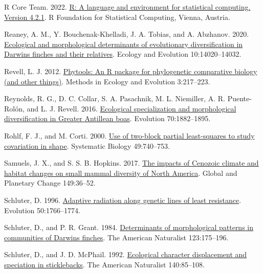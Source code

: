 \documentclass[
  11pt,
]{article}
\newlength{\cslhangindent}
\newlength{\cslentryspacingunit} %
\newenvironment{CSLReferences}[2] %
 {%
  \setlength{\parindent}{0pt}
  \ifodd #1
  \let\oldpar\par
  \def\par{\hangindent=\cslhangindent\oldpar}
  \fi
  \setlength{\parskip}{#2\cslentryspacingunit}
 }%
 {}
\begin{document}
\begin{CSLReferences}{1}{0}
\leavevmode{}%
R Core Team. 2022. \href{https://www.R-project.org/}{R: A language and
environment for statistical computing. Version 4.2.1}. R Foundation for
Statistical Computing, Vienna, Austria.

\leavevmode{}%
Reaney, A. M., Y. Bouchenak-Khelladi, J. A. Tobias, and A. Abzhanov.
2020. \href{https://doi.org/10.1002/ece3.6994}{Ecological and
morphological determinants of evolutionary diversification in
{D}arwin{\textquotesingle}s finches and their relatives}. Ecology and
Evolution 10:14020--14032.

\leavevmode{}%
Revell, L. J. 2012.
\href{https://doi.org/10.1111/j.2041-210X.2011.00169.x}{Phytools: An {R}
package for phylogenetic comparative biology (and other things)}.
Methods in Ecology and Evolution 3:217--223.

\leavevmode{}%
Reynolds, R. G., D. C. Collar, S. A. Pasachnik, M. L. Niemiller, A. R.
Puente-Rolón, and L. J. Revell. 2016.
\href{https://doi.org/10.1111/evo.12987}{{Ecological specialization and
morphological diversification in {G}reater {A}ntillean boas}}. Evolution
70:1882--1895.

\leavevmode{}%
Rohlf, F. J., and M. Corti. 2000.
\href{https://doi.org/10.1080/106351500750049806}{Use of two-block
partial least-squares to study covariation in shape}. Systematic Biology
49:740--753.

\leavevmode{}%
Samuels, J. X., and S. S. B. Hopkins. 2017.
\href{https://doi.org/10.1016/j.gloplacha.2016.12.014}{{The impacts of
{C}enozoic climate and habitat changes on small mammal diversity of
{N}orth {A}merica}}. Global and Planetary Change 149:36--52.

\leavevmode{}%
Schluter, D. 1996.
\href{https://doi.org/10.1111/j.1558-5646.1996.tb03563.x}{Adaptive
radiation along genetic lines of least resistance}. Evolution
50:1766--1774.

\leavevmode{}%
Schluter, D., and P. R. Grant. 1984.
\href{https://doi.org/10.1086/284196}{Determinants of morphological
patterns in communities of {D}arwin{\textquotesingle}s finches}. The
American Naturalist 123:175--196.

\leavevmode{}%
Schluter, D., and J. D. McPhail. 1992.
\href{https://doi.org/10.1086/285404}{Ecological character displacement
and speciation in sticklebacks}. The American Naturalist 140:85--108.


\end{CSLReferences}
\end{document}
